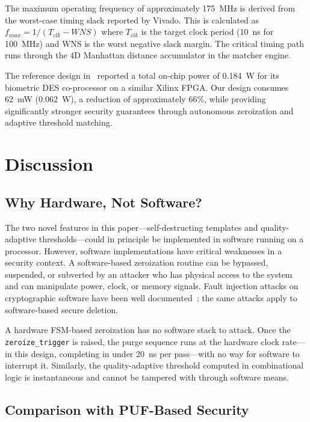 \documentclass[conference]{IEEEtran}
\begin{document}
The maximum operating frequency of approximately 175~MHz is derived
from the worst-case timing slack reported by Vivado. This is
calculated as $f_{max} = 1 / (T_{clk} - WNS)$ where $T_{clk}$ is
the target clock period (10~ns for 100~MHz) and WNS is the worst
negative slack margin. The critical timing path runs through the
4D Manhattan distance accumulator in the matcher engine.

The reference design in~\cite{verilog_biometric} reported a total
on-chip power of 0.184~W for its biometric DES co-processor on a
similar Xilinx FPGA. Our design consumes 62~mW (0.062~W), a
reduction of approximately 66\%, while providing significantly
stronger security guarantees through autonomous zeroization and
adaptive threshold matching.

\section{Discussion}

\subsection{Why Hardware, Not Software?}

The two novel features in this paper---self-destructing templates
and quality-adaptive thresholds---could in principle be implemented
in software running on a processor. However, software implementations
have critical weaknesses in a security context. A software-based
zeroization routine can be bypassed, suspended, or subverted by an
attacker who has physical access to the system and can manipulate
power, clock, or memory signals. Fault injection attacks on
cryptographic software have been well documented~\cite{fault_attack};
the same attacks apply to software-based secure deletion.

A hardware FSM-based zeroization has no software stack to attack.
Once the \texttt{zeroize\_trigger} is raised, the purge sequence runs
at the hardware clock rate---in this design, completing in under
20~ns per pass---with no way for software to interrupt it. Similarly,
the quality-adaptive threshold computed in combinational logic is
instantaneous and cannot be tampered with through software means.

\subsection{Comparison with PUF-Based Security}
\end{document}
